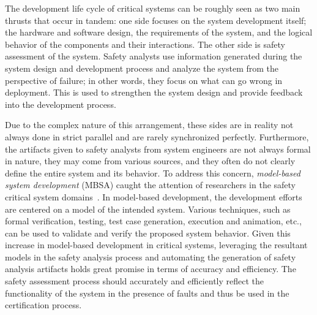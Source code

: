 The development life cycle of critical systems can be roughly seen as two main thrusts that occur in tandem: one side focuses on the system development itself; the hardware and software design, the requirements of the system, and the logical behavior of the components and their interactions. The other side is safety assessment of the system. Safety analysts use information generated during the system design and development process and analyze the system from the perspective of failure; in other words, they focus on what can go wrong in deployment. This is used to strengthen the system design and provide feedback into the development process.

Due to the complex nature of this arrangement, these sides are in reality not always done in strict parallel and are rarely synchronized perfectly. Furthermore, the artifacts given to safety analysts from system engineers are not always formal in nature, they may come from various sources, and they often do not clearly define the entire system and its behavior. To address this concern, \emph{model-based system development} (MBSA) caught the attention of researchers in the safety critical system domains~\cite{Joshi05:Dasc,CAV2015:BoCiGrMa,info17:HaLuHo,5979344,Gudemann:2010:FQQ:1909626.1909813}. In model-based development, the development efforts are centered on a model of the intended system. Various techniques, such as formal verification, testing, test case generation, execution and animation, etc., can be used to validate and verify the proposed system behavior. Given this increase in model-based development in critical systems, leveraging the resultant models in the safety analysis process and automating the generation of safety analysis artifacts holds great promise in terms of accuracy and efficiency. The safety assessment process should accurately and efficiently reflect the functionality of the system in the presence of faults and thus be used in the certification process. 




